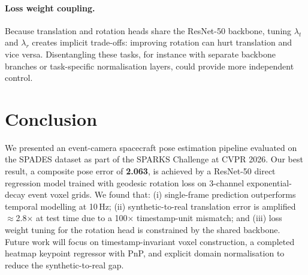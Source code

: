 \documentclass[10pt,twocolumn,letterpaper]{article}
\begin{document}
\paragraph{Loss weight coupling.}
Because translation and rotation heads share the ResNet-50 backbone,
tuning $\lambda_t$ and $\lambda_r$ creates implicit trade-offs:
improving rotation can hurt translation and vice versa.  Disentangling
these tasks, for instance with separate backbone branches or
task-specific normalisation layers, could provide more independent control.

\section{Conclusion}
\label{sec:conclusion}

We presented an event-camera spacecraft pose estimation pipeline
evaluated on the SPADES dataset as part of the SPARKS Challenge at
CVPR 2026.  Our best result, a composite pose error of \textbf{2.063},
is achieved by a ResNet-50 direct regression model trained with
geodesic rotation loss on 3-channel exponential-decay event voxel grids.
We found that: (i) single-frame prediction outperforms temporal
modelling at 10\,Hz; (ii) synthetic-to-real translation error is
amplified $\approx$2.8$\times$ at test time due to a 100$\times$
timestamp-unit mismatch; and (iii) loss weight tuning for the
rotation head is constrained by the shared backbone.
Future work will focus on timestamp-invariant voxel construction,
a completed heatmap keypoint regressor with PnP, and explicit domain
normalisation to reduce the synthetic-to-real gap.

{\small


}
\end{document}
